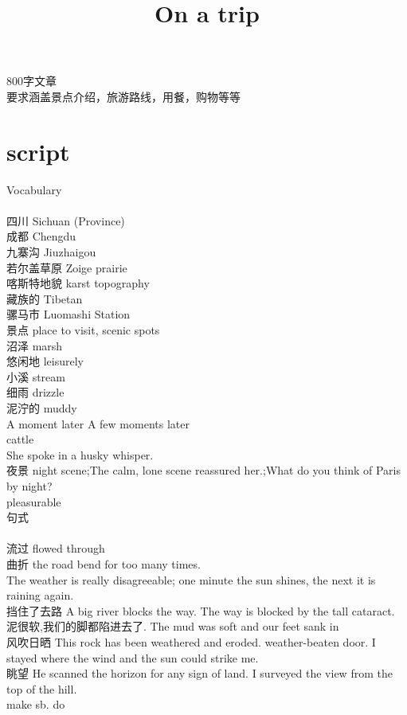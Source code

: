 \documentclass[UTF8]{article}
\title{On a trip}
\date{}
\begin{document}
\maketitle

800字文章 \\
要求涵盖景点介绍，旅游路线，用餐，购物等等

\section{script}

Vocabulary \\ 
\\
四川	Sichuan (Province) \\
成都	Chengdu \\
九寨沟  Jiuzhaigou \\
若尔盖草原 Zoige prairie \\
喀斯特地貌 karst topography \\
藏族的 Tibetan \\
骡马市 Luomashi Station \\
景点 place to visit, scenic spots\\
沼泽 marsh\\
悠闲地 leisurely\\
小溪 stream \\
细雨 drizzle\\
泥泞的 muddy\\
A moment later A few moments later \\
cattle \\
She spoke in a husky whisper. \\
夜景
night scene;The calm, lone scene reassured her.;What do you think of Paris by night? \\
pleasurable\\

句式\\
\\
流过 flowed through\\
曲折 the road bend for too many times.\\
The weather is really disagreeable; one minute the sun shines, the next it is raining again.\\
挡住了去路 A big river blocks the way. The way is blocked by the tall cataract. \\
泥很软,我们的脚都陷进去了.  The mud was soft and our feet sank in \\
风吹日晒 This rock has been weathered and eroded. weather-beaten door. 
I stayed where the wind and the sun could strike me.\\
眺望
He scanned the horizon for any sign of land. 
I surveyed the view from the top of the hill.\\
make sb. do\\
\end{document}

